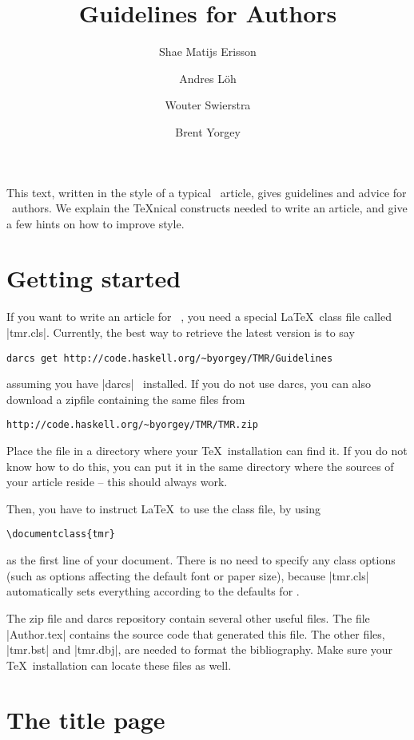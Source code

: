 \documentclass{tmr}
\title{Guidelines for Authors}
\author{Shae Matijs Erisson\email{shae@scannedinavian.com}}
\author{Andres L\"oh\email{kstmr@andres-loeh.de}}
\author{Wouter Swierstra\email{wss@cs.nott.ac.uk}}
\author{Brent Yorgey\email{byorgey@cis.upenn.edu}}
\begin{document}
\begin{introduction} 
This text, written in the style of a typical \TMR\ 
article, gives guidelines and advice for \TMR\ authors. We explain 
the \TeX nical constructs needed to write an article, and give a 
few hints on how to improve style.
\end{introduction}

\section{Getting started}

If you want to write an article for \TMR~\cite{auth:tmr}, you need a special
\LaTeX\ class file called |tmr.cls|. Currently, the best way
to retrieve the latest version is to say
\begin{Verbatim}
darcs get http://code.haskell.org/~byorgey/TMR/Guidelines
\end{Verbatim}
assuming you have |darcs|~\cite{auth:darcs} installed. If you do not use darcs, you can also download a zipfile containing the same files from
\begin{Verbatim}
http://code.haskell.org/~byorgey/TMR/TMR.zip
\end{Verbatim}

Place the file in a directory where your \TeX\ installation
can find it. If you do not know how to do this, you can put
it in the same directory where the sources of your article
reside -- this should always work.

Then, you have to instruct \LaTeX\ to use the class file,
by using
\begin{Verbatim}
\documentclass{tmr}
\end{Verbatim}
as the first line of your document. There is no need to specify
any class options (such as options affecting the default font
or paper size), because |tmr.cls| automatically sets everything
according to the defaults for \TMR.

The zip file and darcs repository contain several other useful
files. The file |Author.tex| contains the source code that generated
this file. The other files, |tmr.bst| and |tmr.dbj|, are needed to
format the bibliography. Make sure your \TeX\ installation can locate
these files as well.

\section{The title page}
\end{document}
